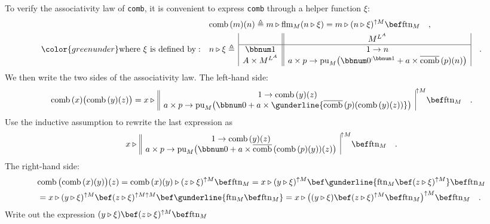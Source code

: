 To verify the associativity law of \lstinline!comb!, it is convenient
to express \lstinline!comb! through a helper function $\xi$:
\begin{align}
 & \text{comb}\,(m)(n)\triangleq m\triangleright\text{flm}_{M}(n\triangleright\xi)=m\triangleright(n\triangleright\xi)^{\uparrow M}\bef\text{ftn}_{M}\quad,\label{eq:comb-defined-via-helper-function-xi}\\
{\color{greenunder}\text{where }\xi\text{ is defined by}:}\quad & n\triangleright\xi\triangleq\,\begin{array}{|c||c|}
 & M^{L^{A}}\\
\hline \bbnum 1 & 1\rightarrow n\\
A\times M^{L^{A}} & a\times p\rightarrow\text{pu}_{M}\big(\bbnum 0^{:\bbnum 1}+a\times\overline{\text{comb}}\,(p)(n)\big)
\end{array}\quad.\nonumber 
\end{align}
We then write the two sides of the associativity law. The left-hand
side:
\[
\text{comb}\,(x)\big(\text{comb}\,(y)(z)\big)=x\triangleright\,\begin{array}{||c|}
1\rightarrow\text{comb}\,(y)(z)\\
a\times p\rightarrow\text{pu}_{M}\big(\bbnum 0+a\times\gunderline{\overline{\text{comb}}\,(p)(\text{comb}\,(y)(z))}\big)
\end{array}^{\uparrow M}\bef\text{ftn}_{M}\quad.
\]
Use the inductive assumption to rewrite the last expression as
\[
x\triangleright\,\begin{array}{||c|}
1\rightarrow\text{comb}\,(y)(z)\\
a\times p\rightarrow\text{pu}_{M}\big(\bbnum 0+a\times\overline{\text{comb}}\,(\text{comb}\,(p)(y))(z)\big)
\end{array}^{\uparrow M}\bef\text{ftn}_{M}\quad.
\]
The right-hand side:
\begin{align*}
 & \text{comb}\,\big(\text{comb}\,(x)(y)\big)(z)=\text{comb}\,(x)(y)\triangleright(z\triangleright\xi)^{\uparrow M}\bef\text{ftn}_{M}=x\triangleright(y\triangleright\xi)^{\uparrow M}\bef\gunderline{\text{ftn}_{M}\bef(z\triangleright\xi)^{\uparrow M}}\bef\text{ftn}_{M}\\
 & =x\triangleright(y\triangleright\xi)^{\uparrow M}\bef(z\triangleright\xi)^{\uparrow M\uparrow M}\bef\gunderline{\text{ftn}_{M}\bef\text{ftn}_{M}}=x\triangleright\big((y\triangleright\xi)\bef(z\triangleright\xi)^{\uparrow M}\bef\text{ftn}_{M}\big)^{\uparrow M}\bef\text{ftn}_{M}\quad.
\end{align*}
Write out the expression $(y\triangleright\xi)\bef(z\triangleright\xi)^{\uparrow M}\bef\text{ftn}_{M}$
